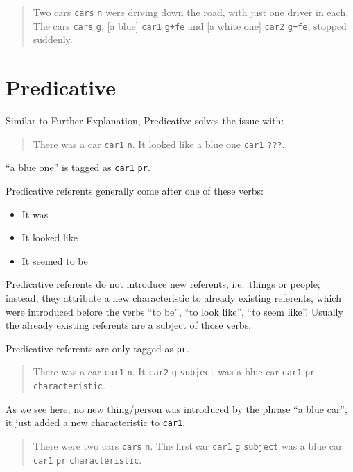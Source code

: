 \documentclass[
]{book}
\providecommand{\tightlist}{%
  \setlength{\itemsep}{0pt}\setlength{\parskip}{0pt}}
\begin{document}
\begin{quote}
Two cars \texttt{cars} \texttt{n} were driving down the road,
with just one driver in each.
The cars \texttt{cars} \texttt{g},
{[}a blue{]} \texttt{car1} \texttt{g+fe} and {[}a white one{]} \texttt{car2} \texttt{g+fe},
stopped suddenly.
\end{quote}

\hypertarget{predicative}{%
\section{Predicative}\label{predicative}}

Similar to Further Explanation, Predicative solves the issue with:

\begin{quote}
There was a car \texttt{car1} \texttt{n}. It looked like a blue one \texttt{car1} \texttt{???}.
\end{quote}

``a blue one'' is tagged as \texttt{car1} \texttt{pr}.

Predicative referents generally come after one of these verbs:

\begin{itemize}
\tightlist
\item
  It was
\item
  It looked like
\item
  It seemed to be
\end{itemize}

Predicative referents do not introduce new referents, i.e.~things or people;
instead, they attribute a new characteristic to already existing referents, which were introduced
before the verbs ``to be'', ``to look like'', ``to seem like''. Usually the already existing referents are
a subject of those verbs.

Predicative referents are only tagged as \texttt{pr}.

\begin{quote}
There was a car \texttt{car1} \texttt{n}.
It \texttt{car2} \texttt{g} \texttt{subject} was a blue car \texttt{car1} \texttt{pr} \texttt{characteristic}.
\end{quote}

As we see here, no new thing/person was introduced by the phrase ``a blue car'', it just added a new characteristic to \texttt{car1}.

\begin{quote}
There were two cars \texttt{cars} \texttt{n}.
The first car \texttt{car1} \texttt{g} \texttt{subject} was a blue car \texttt{car1} \texttt{pr} \texttt{characteristic}.
\end{quote}
\end{document}
